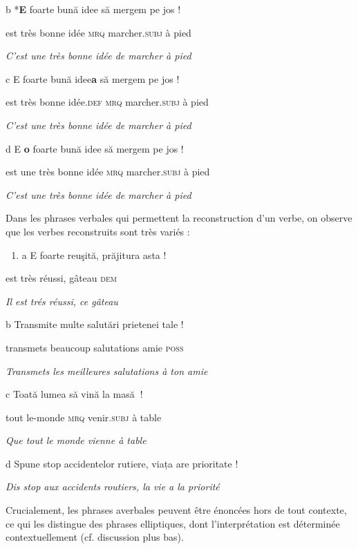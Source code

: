 b  *\textbf{E}  foarte  bună  idee  să  mergem  pe jos !

  est  très  bonne  idée  \textsc{mrq}  marcher.\textsc{subj } à pied 

{\itshape
C'est une très bonne idée de marcher à pied}

c  E  foarte  bună  idee\textbf{a}  să  mergem  pe jos !

  est  très  bonne  idée.\textsc{def}  \textsc{mrq}  marcher.\textsc{subj } à pied

{\itshape
C'est une très bonne idée de marcher à pied}

d  E  \textbf{o } foarte  bună  idee  să  mergem  pe jos ! 

  est  une  très  bonne  idée  \textsc{mrq}  marcher.\textsc{subj } à pied

{\itshape
    C'est une très bonne idée de marcher à pied}

Dans les phrases verbales qui permettent la reconstruction d'un verbe, on observe que les verbes reconstruits sont très variés :


\begin{enumerate}
\item a  E  foarte  reuşită,  prăjitura  asta !


\end{enumerate}
    est  très   réussi,  gâteau  \textsc{dem}

\textit{  Il est trés réussi, ce gâteau}  

  b  Transmite  multe  salutări  prietenei  tale !

    transmets  beaucoup  salutations  amie  \textsc{poss}

    \textit{Transmets les meilleures salutations à ton amie}  

c  Toată  lumea  să  vină  la  masă\textbf{~}!

  tout  le-monde  \textsc{mrq}  venir.\textsc{subj}  à  table

  \textit{Que tout le monde vienne à table}

  d  Spune stop accidentelor rutiere, viața are prioritate !

{\itshape
    Dis stop aux accidents routiers, la vie a la priorité}

Crucialement, les phrases averbales peuvent être énoncées hors de tout contexte, ce qui les distingue des phrases elliptiques, dont l'interprétation est déterminée contextuellement (cf. discussion plus bas).

